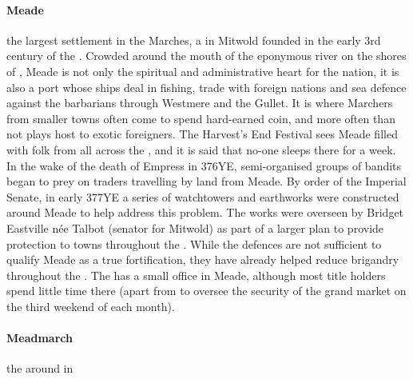 \paragraph{Meade} the largest settlement in the Marches, a  in Mitwold founded in the early 3rd century of the . Crowded around the mouth of the eponymous river on the shores of , Meade is not only the spiritual and administrative heart for the nation, it is also a port whose ships deal in fishing, trade with foreign nations and sea defence against the barbarians through Westmere and the Gullet. It is where Marchers from smaller towns often come to spend hard-earned coin, and more often than not plays host to exotic foreigners. \localpar The Harvest's End Festival sees Meade filled with folk from all across the , and it is said that no-one sleeps there for a week. In the wake of the death of Empress  in 376YE, semi-organised groups of bandits began to prey on traders travelling by land from Meade. \localpar By order of the Imperial Senate, in early 377YE a series of watchtowers and earthworks were constructed around Meade to help address this problem. The works were overseen by Bridget Eastville née Talbot (senator for Mitwold) as part of a larger plan to provide protection to towns throughout the . While the defences are not sufficient to qualify Meade as a true fortification, they have already helped reduce brigandry throughout the . The  has a small office in Meade, although most title holders spend little time there (apart from to oversee the security of the grand market on the third weekend of each month).  
\paragraph{Meadmarch} the  around  in 
